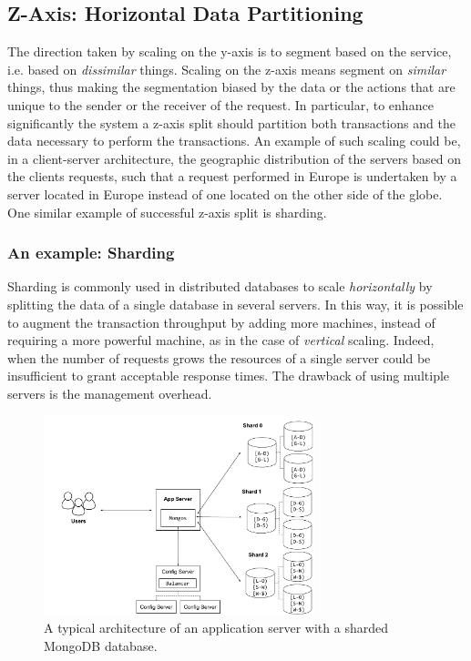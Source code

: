 \subsection{Z-Axis: Horizontal Data Partitioning}
\label{sec:z-axis}

The direction taken by scaling on the y-axis is to segment based on the service,
i.e. based on \emph{dissimilar} things. Scaling on the z-axis means segment on
\emph{similar} things, thus making the segmentation biased by the data or the
actions that are unique to the sender or the receiver of the request. In
particular, to enhance significantly the system a z-axis split should partition
both transactions and the data necessary to perform the transactions. An example
of such scaling could be, in a client-server architecture, the geographic
distribution of the servers based on the clients requests, such that a request
performed in Europe is undertaken by a server located in Europe instead of one
located on the other side of the globe. One similar example of successful z-axis
split is sharding.

\subsubsection{An example: Sharding}
Sharding is commonly used in distributed databases to scale \emph{horizontally}
by splitting the data of a single database in several servers. In this way, it
is possible to augment the transaction throughput by adding more machines,
instead of requiring a more powerful machine, as in the case of \emph{vertical}
scaling.
Indeed, when the number of requests grows the resources of a single server
could be insufficient to grant acceptable response times. The drawback of using
multiple servers is the management overhead.


\begin{figure}
  \begin{center}
    \includegraphics[width=0.7\textwidth]{./res/img/mongodb}
    \caption{A typical architecture of an application server with a sharded
    MongoDB database.}
    \label{fig:mongodb}
  \end{center}
\end{figure}

